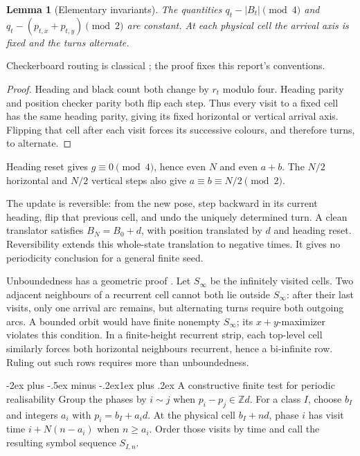 \documentclass[11pt,letterpaper]{article}
\makeatletter
\renewcommand\section{\@startsection{section}{1}{\z@}%
  {-2ex plus -.5ex minus -.2ex}{1ex plus .2ex}%
  {\normalfont\Large\bfseries}}
\newtheorem{lemma}[theorem]{Lemma}
\newcommand{\Z}{\mathbb Z}
\makeatother
\begin{document}
\begin{lemma}[Elementary invariants]\label{lem:elementary}
The quantities $q_t-|B_t|\pmod4$ and
$q_t-(p_{t,x}+p_{t,y})\pmod2$ are constant. At each physical cell the
arrival axis is fixed and the turns alternate.
\end{lemma}
Checkerboard routing is classical \cite{GaleProppSutnerTroubetzkoy1995};
the proof fixes this report's conventions.
\begin{proof}
Heading and black count both change by $r_t$ modulo four. Heading parity
and position checker parity both flip each step. Thus every visit to a
fixed cell has the same heading parity, giving its fixed horizontal or
vertical arrival axis. Flipping that cell after each visit forces its
successive colours, and therefore turns, to alternate.
\end{proof}
Heading reset gives $g\equiv0\pmod4$, hence even $N$ and even $a+b$.
The $N/2$ horizontal and $N/2$ vertical steps also give
$a\equiv b\equiv N/2\pmod2$.


The update is reversible: from the new pose, step backward in its current
heading, flip that previous cell, and undo the uniquely determined turn.
A clean translator satisfies $B_N=B_0+d$, with position translated by
$d$ and heading reset. Reversibility extends this whole-state translation to negative times.
It gives no periodicity conclusion for a general finite seed.

Unboundedness has a geometric proof \cite{BunimovichTroubetzkoy1992}.
Let $S_\infty$ be the infinitely visited cells. Two adjacent neighbours
of a recurrent cell cannot both lie outside $S_\infty$: after their last
visits, only one arrival arc remains, but alternating turns require both
outgoing arcs. A bounded orbit would have finite nonempty $S_\infty$;
its $x+y$-maximizer violates this condition. In a finite-height recurrent
strip, each top-level cell similarly forces both horizontal neighbours
recurrent, hence a bi-infinite row. Ruling out such rows requires more
than unboundedness.

\section{A constructive finite test for periodic realisability}
Group the phases by $i\sim j$ when $p_i-p_j\in\Z d$. For a class $I$,
choose $b_I$ and integers $a_i$ with $p_i=b_I+a_i d$. At the physical cell $b_I+nd$, phase $i$ has visit time $i+N(n-a_i)$
when $n\ge a_i$. Order those visits by time and call the resulting
symbol sequence $S_{I,n}$.
\end{document}
